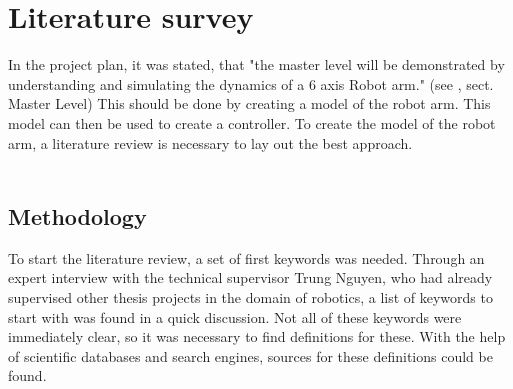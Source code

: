 \chapter{Literature survey}

In the project plan, it was stated, that "the master level will be demonstrated by understanding and simulating the dynamics of a 6 axis Robot arm." (see \cite{ProjectPlan}, sect. Master Level)
This should be done by creating a model of the robot arm. This model can then be used to create a controller.
To create the model of the robot arm, a literature review is necessary to lay out the best approach.\\
\\ 



\section{Methodology}

To start the literature review, a set of first keywords was needed. Through an expert interview with the technical supervisor Trung Nguyen, %
who had already supervised other thesis projects in the domain of robotics, a list of keywords to start with was found in a quick discussion. 
Not all of these keywords were immediately clear, so it was necessary to find definitions for these. 
With the help of scientific databases and search engines, sources for these definitions could be found.\\




